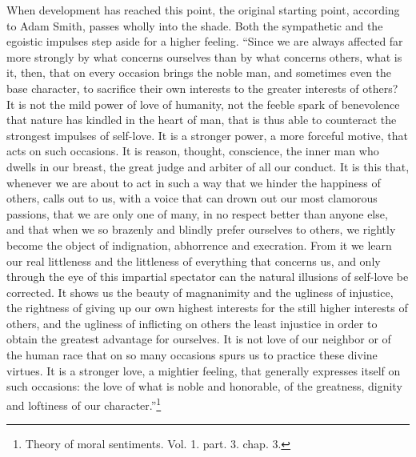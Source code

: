\documentclass[12pt,a4paper,openany]{book}
\newcommand{\opage}[1]{\marginnote{\footnotesize\textit{[#1]}}}
\begin{document}
When development has reached this point, the original starting point,
according to Adam Smith, passes wholly into the shade. Both the sympathetic
and the egoistic impulses step aside for a higher feeling. ``Since we are
always affected far more strongly by what concerns ourselves than by what
concerns others, what is it, then, that on every occasion brings the noble
man, and sometimes even the base character, to sacrifice their own interests
to the greater interests of others? It is not the mild power of love of
humanity, not the feeble spark of benevolence that \opage{42}nature has
kindled in the heart of man, that is thus able to counteract the strongest
impulses of self-love. It is a stronger power, a more forceful motive, that
acts on such occasions. It is reason, thought, conscience, the inner man who
dwells in our breast, the great judge and arbiter of all our conduct. It is
this that, whenever we are about to act in such a way that we hinder the
happiness of others, calls out to us, with a voice that can drown out our most
clamorous passions, that we are only one of many, in no respect better than
anyone else, and that when we so brazenly and blindly prefer ourselves to
others, we rightly become the object of indignation, abhorrence and
execration. From it we learn our real littleness and the littleness of
everything that concerns us, and only through the eye of this impartial
spectator can the natural illusions of self-love be corrected. It shows us the
beauty of magnanimity and the ugliness of injustice, the rightness of giving
up our own highest interests for the still higher interests of others, and the
ugliness of inflicting on others the least injustice in order to obtain the
greatest advantage for ourselves. It is not love of our neighbor or of the
human race that on so many occasions spurs us to practice these divine
virtues. It is a stronger love, a mightier feeling, that generally expresses
itself on such occasions: the love of what is noble and honorable, of the
greatness, dignity and loftiness of our character.''\footnote[1]{Theory of
moral sentiments. Vol. 1. part. 3. chap. 3.}
\end{document}
